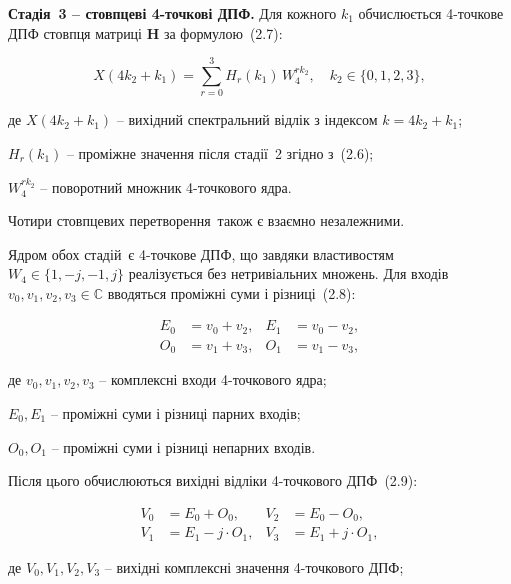 \documentclass[
]{article}
\begin{document}
\textbf{Стадія~3 -- стовпцеві 4-точкові ДПФ.} Для кожного \(k_{1}\)
обчислюється 4-точкове ДПФ стовпця матриці \(\mathbf{H}\) за формулою~(2.7):

\begin{equation}
\tag{2.7}\label{eq:stage3-X}
X(4k_{2} + k_{1}) = \sum_{r = 0}^{3}H_{r}(k_{1})\, W_{4}^{rk_{2}},\quad k_{2} \in \{ 0,1,2,3\},
\end{equation}

де \(X(4k_{2} + k_{1})\) -- вихідний спектральний відлік з індексом \(k = 4k_{2} + k_{1}\);

\(H_{r}(k_{1})\) -- проміжне значення після стадії~2 згідно з~(2.6);

\(W_{4}^{rk_{2}}\) -- поворотний множник 4-точкового ядра.

Чотири стовпцевих перетворення~також є взаємно незалежними.

Ядром обох стадій~є 4-точкове ДПФ, що завдяки властивостям
\(W_{4} \in \{ 1, - j, - 1,j\}\) реалізується без нетривіальних множень.
Для входів \(v_{0},v_{1},v_{2},v_{3}\mathbb{\in C}\) вводяться проміжні
суми і різниці~(2.8):

\begin{equation}
\tag{2.8}\label{eq:butterfly-EO}
\begin{aligned}
E_{0} & = v_{0} + v_{2}, & E_{1} & = v_{0} - v_{2}, \\
O_{0} & = v_{1} + v_{3}, & O_{1} & = v_{1} - v_{3},
\end{aligned}
\end{equation}

де \(v_{0},v_{1},v_{2},v_{3}\) -- комплексні входи 4-точкового ядра;

\(E_{0},E_{1}\) -- проміжні суми і різниці парних входів;

\(O_{0},O_{1}\) -- проміжні суми і різниці непарних входів.

Після цього обчислюються вихідні відліки 4-точкового ДПФ~(2.9):

\begin{equation}
\tag{2.9}\label{eq:butterfly-V}
\begin{aligned}
V_{0} & = E_{0} + O_{0}, & V_{2} & = E_{0} - O_{0}, \\
V_{1} & = E_{1} - j \cdot O_{1}, & V_{3} & = E_{1} + j \cdot O_{1},
\end{aligned}
\end{equation}

де \(V_{0},V_{1},V_{2},V_{3}\) -- вихідні комплексні значення 4-точкового ДПФ;
\end{document}
